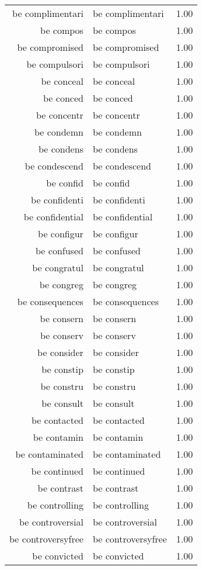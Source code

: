 \begin{table}[ht]
\begin{tabular}{rlr}
  be complimentari & be complimentari & 1.00 \\ 
  be compos & be compos & 1.00 \\ 
  be compromised & be compromised & 1.00 \\ 
  be compulsori & be compulsori & 1.00 \\ 
  be conceal & be conceal & 1.00 \\ 
  be conced & be conced & 1.00 \\ 
  be concentr & be concentr & 1.00 \\ 
  be condemn & be condemn & 1.00 \\ 
  be condens & be condens & 1.00 \\ 
  be condescend & be condescend & 1.00 \\ 
  be confid & be confid & 1.00 \\ 
  be confidenti & be confidenti & 1.00 \\ 
  be confidential & be confidential & 1.00 \\ 
  be configur & be configur & 1.00 \\ 
  be confused & be confused & 1.00 \\ 
  be congratul & be congratul & 1.00 \\ 
  be congreg & be congreg & 1.00 \\ 
  be consequences & be consequences & 1.00 \\ 
  be consern & be consern & 1.00 \\ 
  be conserv & be conserv & 1.00 \\ 
  be consider & be consider & 1.00 \\ 
  be constip & be constip & 1.00 \\ 
  be constru & be constru & 1.00 \\ 
  be consult & be consult & 1.00 \\ 
  be contacted & be contacted & 1.00 \\ 
  be contamin & be contamin & 1.00 \\ 
  be contaminated & be contaminated & 1.00 \\ 
  be continued & be continued & 1.00 \\ 
  be contrast & be contrast & 1.00 \\ 
  be controlling & be controlling & 1.00 \\ 
  be controversial & be controversial & 1.00 \\ 
  be controversyfree & be controversyfree & 1.00 \\ 
  be convicted & be convicted & 1.00 \\ 

\end{tabular}
\end{table}
